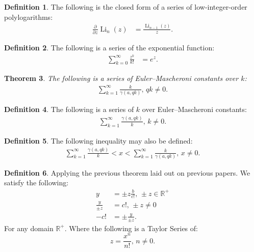 \documentclass[10pt]{article}
\theoremstyle{plain}
\newtheorem{theorem}{Theorem}[section]
\theoremstyle{definition}
\newtheorem{definition}[theorem]{Definition}
\theoremstyle{remark}
\begin{document}
\begin{definition}
	The following is the closed form of a series of low-integer-order polylogarithms:
	\begin{align*}
		\frac{\partial}{\partial z} \operatorname{Li}_{n}(z) &= \frac{\operatorname{Li}_{n-1}(z)}{z}.
	\end{align*}
\end{definition}

\begin{definition}
	The following is a series of the exponential function:
	\begin{align*}
		\sum_{k=0}^{\infty} \frac{z^k}{k!} &= e^{z}.
	\end{align*}
\end{definition}

\begin{theorem}
	The following is a series of Euler–Mascheroni constants over $k$:
	\begin{align*}
		\sum_{k=1}^{\infty} \frac{k}{\gamma(a, qk)}, \, qk \neq 0.
	\end{align*}
\end{theorem}

\begin{definition}
	The following is a series of $k$ over Euler–Mascheroni constants:
	\begin{align*}
		\sum_{k=1}^{\infty} \frac{\gamma(a, qk)}{k}, \, k \neq 0.
	\end{align*}
\end{definition}

\begin{definition}
	The following inequality may also be defined:
	\begin{align*}
		\sum_{k=1}^{\infty} \frac{\gamma(a, qk)}{k} < x < \sum_{k=1}^{\infty} \frac{k}{\gamma(a, qk)}, \, x \neq 0.
	\end{align*}
\end{definition}

\begin{definition}
	Applying the previous theorem laid out on previous papers. We satisfy the following:
	\begin{align*}
		y &= \pm z \frac{b}{c!}, \, \pm z \in \mathbb{R}^{+}\\
		\frac{y}{\pm z} &= c!, \, \pm z \neq 0\\
		-c! &= \pm \frac{y}{\pm z}.
	\end{align*}
	For any domain $\mathbb{R}^{+}$. Where the following is a Taylor Series of:
	\begin{equation}
		z = \frac{x^n}{n!}, \, n \neq 0.
	\end{equation}
\end{definition}
\end{document}
